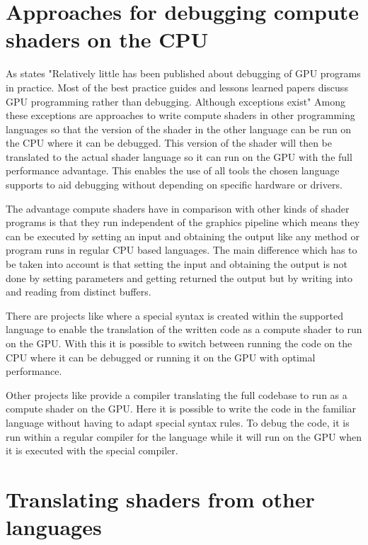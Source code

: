 \section{Approaches for debugging compute shaders on the CPU}
\label{section:computeApproaches}

As  states "Relatively little has been published about debugging of GPU programs  in  practice.  Most  of  the  best  practice  guides  and lessons learned papers discuss GPU programming rather than debugging. Although exceptions exist" Among these exceptions are approaches to write compute shaders in other programming languages so that the version of the shader in the other language can be run on the CPU where it can be debugged. This version of the shader will then be translated to the actual shader language so it can run on the GPU with the full performance advantage. This enables the use of all tools the chosen language supports to aid debugging without depending on specific hardware or drivers.

The advantage compute shaders have in comparison with other kinds of shader programs is that they run independent of the graphics pipeline which means they can be executed by setting an input and obtaining the output like any method or program runs in regular CPU based languages. The main difference which has to be taken into account is that setting the input and obtaining the output is not done by setting parameters and getting returned the output but by writing into and reading from distinct buffers.

There are projects like  where a special syntax is created within the supported language to enable the translation of the written code as a compute shader to run on the GPU. With this it is possible to switch between running the code on the CPU where it can be debugged or running it on the GPU with optimal performance.

Other projects like  provide a compiler translating the full codebase to run as a compute shader on the GPU. Here it is possible to write the code in the familiar language without having to adapt special syntax rules. To debug the code, it is run within a regular compiler for the language while it will run on the GPU when it is executed with the special compiler.

\section{Translating shaders from other languages}\label{section:translating}


